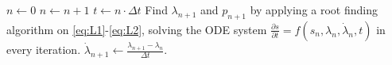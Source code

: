 \begin{algorithm}
\caption{$0D\_monolithic(T, \Delta t)$}
\begin{algorithmic}[1]
    \State $n \gets 0$
        \State $n \gets n + 1$
        \State $t \gets n \cdot \Delta t$
        \State Find $\lambda_{n+1}$ and $p_{n+1}$ by applying a root finding algorithm on \eqref{eq:L1}-\eqref{eq:L2}, solving the ODE system $\frac{ \partial s }{ \partial t }=f(s_{n},\lambda_{n},\dot{\lambda}_{n},t)$ in every iteration.
        \State $\dot{\lambda}_{n+1} \gets \frac{\lambda_{n+1}-\lambda_{n}}{\Delta t}$.
    \EndWhile
\end{algorithmic}
\end{algorithm}
